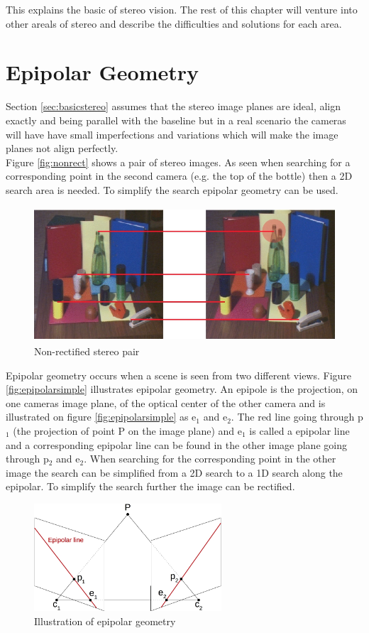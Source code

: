 This explains the basic of stereo vision. The rest of this chapter will venture into other areals of stereo and describe the difficulties and solutions for each area.

\section{Epipolar Geometry}
Section \ref{sec:basicstereo} assumes that the stereo image planes are ideal, align exactly and being parallel with the baseline but in a real scenario the cameras will have have small imperfections and variations which will make the image planes not align perfectly.\\
 
Figure \vref{fig:nonrect} shows a pair of stereo images. As seen when searching for a corresponding point in the second camera (e.g. the top of the bottle) then a 2D search area is needed. To simplify the search epipolar geometry can be used. \\
\begin{figure}[ht!]
  \centering\includegraphics[height=5cm]{figures/nonrect.jpg}
  \caption{Non-rectified stereo pair\label{fig:nonrect} \cite{Mattoccia2013}}
\end{figure}

Epipolar geometry occurs when a scene is seen from two different views. Figure \vref{fig:epipolarsimple} illustrates epipolar geometry. An epipole is the projection, on one cameras image plane, of the optical center of the other camera and is illustrated on figure \vref{fig:epipolarsimple} as e$_1$ and e$_2$. The red line going through p$_1$ (the projection of point P on the image plane) and e$_1$ is called a epipolar line and a corresponding epipolar line can be found in the other image plane going through p$_2$ and e$_2$. When searching for the corresponding point in the other image the search can be simplified from a 2D search to a 1D search along the epipolar. To simplify the search further the image can be rectified.\\
\begin{figure}[ht!]
  \centering
  \includegraphics[height=4cm]{figures/epipolarsimple}
  \caption{Illustration of epipolar geometry}
  \label{fig:epipolarsimple}
\end{figure}

